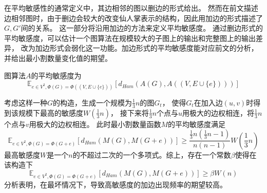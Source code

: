 在平均敏感性的通常定义中，其边相邻的图以删边的形式给出。\cite{varma2023average}
然而在前文描述边相邻图时，由于删边会较大的改变仙人掌表示的结构，因此用加边的形式描述了$G,G'$间的关系。
这一部分将沿用加边的方法来定义平均敏感度。
通过删边形式的平均敏感度，可以估计一个图算法在规模较大的子图上的输出和完整图上的输出差异，
改为加边形式会弱化这一功能。加边形式的平均敏感度能对应前文的分析，并给出最小割数量变化值的期望。

\begin{definition}
  图算法$A$的平均敏感度为
  \begin{equation*}
    \mathbb E_{e\in V^2,\Phi(G)=\Phi((V,E\cup\{e\}))}[d_{Ham}(A(G),A((V,E\cup\{e\})))]
  \end{equation*}
\end{definition}

考虑这样一种$G$的构造，生成一个规模为$\frac 13n$的图$G_t$，
使得$G_t$在加入边$(u,v)$时得到该规模下最高的敏感度$W(\frac 13n)$，
接下来将$\frac 13n$个点与$u$用极大的边权相连，将$\frac 13n$个点与$v$用极大的边权相连。
此时最小割数量函数$M$的平均敏感度满足
\begin{equation*}
  \mathbb E_{e\in V^2,\Phi(G)=\Phi(G+e)}[d_{Ham}(M(G),M(G+e))]\geq \frac{\frac 13n(\frac 13n-1)}{n(n-1)}W(\frac 13n)
\end{equation*}
最高敏感度$W$是一个$n$的不超过二次的一个多项式。综上，存在一个常数$\beta$使得在该构造下
\begin{equation*}
  \mathbb E_{e\in V^2,\Phi(G)=\Phi(G+e)}[d_{Ham}(M(G),M(G+e))]\geq \beta W(n)
\end{equation*}
分析表明，在最坏情况下，导致高敏感度的加边出现频率的期望较高。
